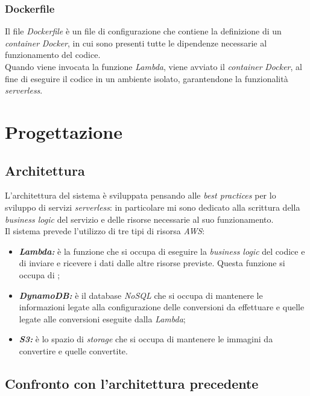 \subsubsection{Dockerfile}

Il file \emph{Dockerfile} è un file di configurazione che contiene la
definizione di un \emph{container} \emph{Docker}, in cui sono presenti tutte le
dipendenze necessarie al funzionamento del codice. \\
Quando viene invocata la funzione \emph{Lambda}, viene avviato il
\emph{container} \emph{Docker}, al fine di eseguire il codice in un ambiente
isolato, garantendone la funzionalità \emph{serverless}.

\section{Progettazione}

\subsection{Architettura}

L'architettura del sistema è sviluppata pensando alle \emph{best practices} per
lo sviluppo di servizi \emph{serverless}: in particolare mi sono dedicato alla
scrittura della \emph{business logic} del servizio e delle risorse necessarie al
suo funzionamento. \\
Il sistema prevede l'utilizzo di tre tipi di risorsa \emph{AWS}:
\begin{itemize}
    \item \textbf{\emph{Lambda:}} è la funzione che si occupa di eseguire la
          \emph{business logic} del codice e di inviare e ricevere i dati dalle altre risorse
          previste. Questa funzione si occupa di ;
    \item \textbf{\emph{DynamoDB:}} è il database \emph{NoSQL} che si occupa di
          mantenere le informazioni legate alla configurazione delle conversioni da
          effettuare e quelle legate alle conversioni eseguite dalla \emph{Lambda};
    \item \textbf{\emph{S3:}} è lo spazio di \emph{storage} che si occupa di
          mantenere le immagini da convertire e quelle convertite.
\end{itemize}

\subsection{Confronto con l'architettura precedente}

